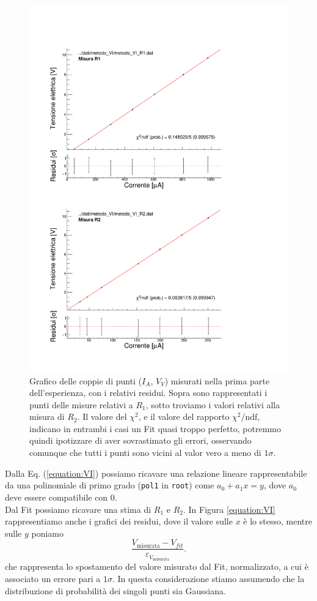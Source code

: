 \documentclass[italian, a4paper, 10pt, twocolumn]{../../style/lab_unige}
\newcommand{\reffig}[1]{Figura {\ref{#1}}}%
\newcommand{\refeqn}[1]{Eq. ({\ref{#1}})}%
\newcommand{\ChiSqr}{$\chi^2$\space}
\newcommand{\ChiNdf}{$\chi^2/\text{ndf}$}
\newcommand{\cernroot}{\texttt{root}}
\newcommand{\mstdErr}[1]{\varepsilon_{#1}}
\begin{document}
    \begin{figure}
        \centering
        \includegraphics[width=\linewidth]{misura_R1_R2.pdf}
        \caption{Grafico delle coppie di punti ($I_A$, $V_V$) misurati nella prima parte dell'esperienza, con i relativi residui. Sopra sono rappresentati i punti delle misure relativi a $R_1$, sotto troviamo i valori relativi alla misura di $R_2$. Il valore del \ChiSqr, e il valore del rapporto \ChiNdf, indicano in entrambi i casi un Fit quasi troppo perfetto, potremmo quindi ipotizzare di aver sovrastimato gli errori, osservando comunque che tutti i punti sono vicini al valor vero a meno di $1\sigma$.}
        \label{figure:plot_R1_R2}
    \end{figure}

    Dalla \refeqn{equation:VI} possiamo ricavare una relazione lineare rappresentabile da una polinomiale di primo grado (\verb|pol1| in \cernroot) come $a_0 + a_1x = y$, dove $a_0$ deve essere compatibile con 0.\\
    Dal Fit possiamo ricavare una stima di $R_1$ e $R_2$. In \reffig{equation:VI} rappresentiamo anche i grafici dei residui, dove il valore sulle $x$ è lo stesso, mentre sulle $y$ poniamo
    \[
        \frac{V_{\text{misurata}}-V_{fit}}{\mstdErr{V_{\text{misurata}}}}.
    \]
    che rappresenta lo spostamento del valore misurato dal Fit, normalizzato, a cui è associato un errore pari a $1\sigma$. In questa considerazione stiamo assumendo che la distribuzione di probabilità dei singoli punti sia Gaussiana.
\end{document}
